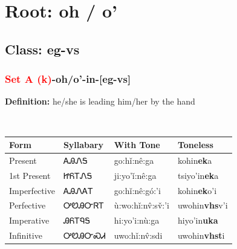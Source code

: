 \needspace{4in}
\section*{Root: oh / o'}
\nopagebreak
{}
\needspace{3in}
\subsection*{Class: eg-vs}
\nopagebreak
\needspace{2in}
\subsubsection*{\textcolor{Red}{Set A (k)}{-}\textbf{oh/o'}{-}in{-}[eg-vs]}
\nopagebreak
\textbf{Definition: } he/she is leading him/her by the hand
\\[0.5em]
\begin{tabularx}{\textwidth}{l X X X}%
\toprule%
\textbf{Form}&\textbf{Syllabary}&\textbf{With Tone}&\textbf{Toneless}\\%
\midrule%
Present&ᎪᎯᏁᎦ&go:hǐ:nê:ga&kohin\textbf{ek}a\\%
1st Present&ᏥᏲᎢᏁᎦ&ji:yo’ǐ:nê:ga&tsiyo'in\textbf{ek}a\\%
Imperfective&ᎪᎯᏁᎪᎢ&go:hǐ:nê:gó:’i&kohin\textbf{ek}o'i\\%
Perfective&ᎤᏬᎯᏅᏒᎢ&ù:wo:hǐ:nv̂:sv̌:’i&uwohin\textbf{vhs}v'i\\%
Imperative&ᎯᏲᎢᏄᎦ&hi:yo’i:nù:ga&hiyo'in\textbf{uka}\\%
Infinitive&ᎤᏬᎯᏅᏍᏗ&uwo:hǐ:nv̂:sdi&uwohin\textbf{vhst}i\\%
\bottomrule%
\end{tabularx}
\\[1em]